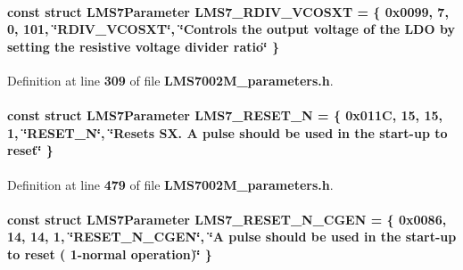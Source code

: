 \paragraph[{L\+M\+S7\+\_\+\+R\+D\+I\+V\+\_\+\+V\+C\+O\+S\+XT}]{\setlength{\rightskip}{0pt plus 5cm}const struct {\bf L\+M\+S7\+Parameter} L\+M\+S7\+\_\+\+R\+D\+I\+V\+\_\+\+V\+C\+O\+S\+XT = \{ 0x0099, 7, 0, 101, \char`\"{}\+R\+D\+I\+V\+\_\+\+V\+C\+O\+S\+X\+T\char`\"{}, \char`\"{}\+Controls the output voltage of the L\+D\+O by setting the resistive voltage divider ratio\char`\"{} \}\hspace{0.3cm}{\ttfamily [static]}}\label{LMS7002M__parameters_8h_a5cb8fdec389d8d03cdcd120695ee4f36}


Definition at line {\bf 309} of file {\bf L\+M\+S7002\+M\+\_\+parameters.\+h}.

\paragraph[{L\+M\+S7\+\_\+\+R\+E\+S\+E\+T\+\_\+N}]{\setlength{\rightskip}{0pt plus 5cm}const struct {\bf L\+M\+S7\+Parameter} L\+M\+S7\+\_\+\+R\+E\+S\+E\+T\+\_\+N = \{ 0x011\+C, 15, 15, 1, \char`\"{}\+R\+E\+S\+E\+T\+\_\+\+N\char`\"{}, \char`\"{}\+Resets S\+X. A pulse should be used in the start-\/up to reset\char`\"{} \}\hspace{0.3cm}{\ttfamily [static]}}\label{LMS7002M__parameters_8h_a56e1b2359bb59e2797b745c633d6d794}


Definition at line {\bf 479} of file {\bf L\+M\+S7002\+M\+\_\+parameters.\+h}.

\paragraph[{L\+M\+S7\+\_\+\+R\+E\+S\+E\+T\+\_\+\+N\+\_\+\+C\+G\+EN}]{\setlength{\rightskip}{0pt plus 5cm}const struct {\bf L\+M\+S7\+Parameter} L\+M\+S7\+\_\+\+R\+E\+S\+E\+T\+\_\+\+N\+\_\+\+C\+G\+EN = \{ 0x0086, 14, 14, 1, \char`\"{}\+R\+E\+S\+E\+T\+\_\+\+N\+\_\+\+C\+G\+E\+N\char`\"{}, \char`\"{}\+A pulse should be used in the start-\/up to reset ( 1-\/normal operation)\char`\"{} \}\hspace{0.3cm}{\ttfamily [static]}}\label{LMS7002M__parameters_8h_a20c1bd164ae973dce8fc429d8a3fb8a3}


